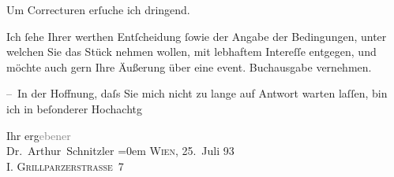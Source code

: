 \pstart
           {\pb}Um Correcturen erſuche ich dringend.\pend
           
\pstart
           Ich ſehe Ihrer werthen Entſcheidung ſowie der Angabe der Bedingungen, unter welchen
               Sie das Stück nehmen wollen, mit lebhaftem
               Intereſſe entgegen, und möchte auch gern Ihre Äußerung über eine event. Buchausgabe
               vernehmen.\pend
           
\pstart
           – In der Hoffnung, daſs {\pb}Sie mich nicht zu lange auf Antwort
               warten laſſen, bin ich in beſonderer Hochachtg\pend
           
\pstart
           Ihr erg\textcolor{gray}{ebener}{\\[\baselineskip]}\spacefill\mbox{Dr. Arthur Schnitzler}\pend
           \leftskip=0em{}
\pstart
           \textsc{Wien}, 25. Juli 93{\\}\textsc{I. Grillparzerstraße 7}\pend
           \endnumbering{}  
      